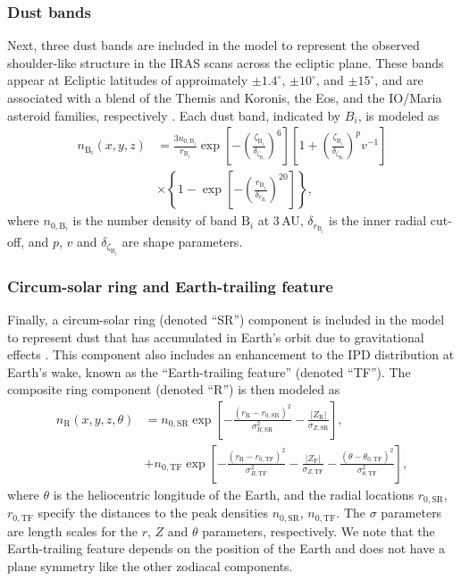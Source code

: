 \documentclass[twocolumn]{aa}
\begin{document}
\subsubsection{Dust bands}
Next, three dust bands are included in the model to represent the
observed shoulder-like structure in the IRAS scans across the ecliptic
plane.  These bands appear at Ecliptic latitudes of approimately
$\pm1.4^\circ$, $\pm10^\circ$, and $\pm15^\circ$, and are associated with
a blend of the Themis and Koronis, the Eos, and the IO/Maria asteroid families, 
respectively \citep{Reach1997}. Each dust band, indicated by $B_i$, is 
modeled as
\begin{align}
    n_{\mathrm{B}_i}(x,y,z) &= \frac{3 n_{0, \mathrm{B}_i}}{r_{\mathrm{B}_i}} \exp \left[-\left(\frac{\zeta_{\mathrm{B}_i}}{\delta_{\zeta_{\mathrm{B}_i}}}\right)^{6}\right]\left[1 + \left(\frac{\zeta_{\mathrm{B}_i}}{\delta_{\zeta_{\mathrm{B}_i}}}\right)^{p}v^{-1}\right] \\
    &\times\left\{1-\exp \left[-\left(\frac{r_{\mathrm{B}_i}}{\delta_{r_{\mathrm{B}_i}}}\right)^{20}\right]\right\},
\label{eq:band}
\end{align}
where $n_{0, \mathrm{B}_i}$ is the number density of band $\mathrm{B}_i$ 
at 3\,AU, $\delta_{r_{\mathrm{B}_i}}$ is the inner radial cut-off, and 
$p$, $v$ and $\delta_{\zeta_{\mathrm{B}_i}}$ are shape parameters.

\subsubsection{Circum-solar ring and Earth-trailing feature}
\label{sec:ring}
Finally, a circum-solar ring (denoted ``SR'') component is included in the
model to represent dust that has accumulated in Earth's orbit due to
gravitational effects \citep{Dermott1994}. This component also
includes an enhancement to the IPD distribution at Earth's wake, known
as the ``Earth-trailing feature'' (denoted ``TF''). The composite ring component (denoted ``R'') is then modeled as
\begin{align}
    n_\mathrm{R}(x, y, z, \theta)&=n_{0, \mathrm{SR}} \exp \left[-\frac{\left(r_\mathrm{R}-r_{0, \mathrm{SR}}\right)^2}{\sigma_{R,\mathrm{SR}} ^2}-\frac{\left| Z_\mathrm{R} \right|}{\sigma_{Z, \mathrm{SR}}}\right],\\
   &+ n_{0, \mathrm{TF}} \exp \left[-\frac{\left(r_\mathrm{R}-r_{0,
          \mathrm{TF}}\right)^{2}}{\sigma_{R,
          \mathrm{TF}}^{2}}-\frac{\left|Z_\mathrm{F}\right|}{\sigma_{Z,
          \mathrm{TF}}}-\frac{\left(\theta-\theta_{0,
          \mathrm{TF}}\right)^{2}}{\sigma_{\theta,\mathrm{TF}}^{2}}\right],
    \label{eq:ring}
\end{align}
where $\theta$ is the heliocentric longitude of the Earth, and the 
radial locations $r_{0, \mathrm{SR}}$, $r_{0, \mathrm{TF}}$ specify
the distances to the peak densities $n_{0, \mathrm{SR}}$, 
$n_{0, \mathrm{TF}}$. The $\sigma$ parameters are length scales for the 
$r$, $Z$ and $\theta$ parameters, respectively. We note that the 
Earth-trailing feature depends on the position of the Earth and does not 
have a plane symmetry like the other zodiacal components. 
\end{document}
